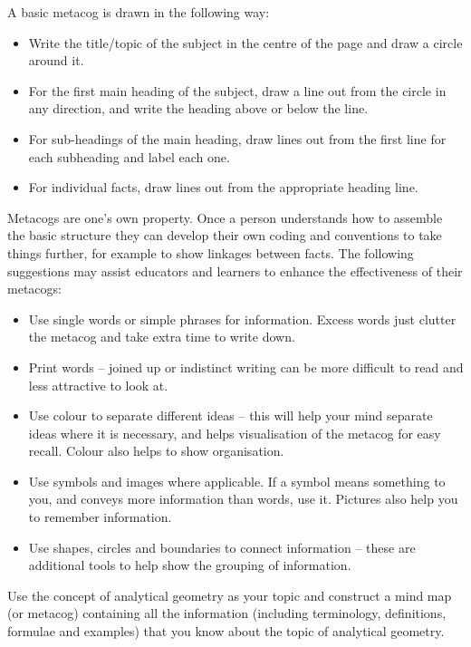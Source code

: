 A basic metacog is drawn in the following way:
\begin{itemize}[noitemsep]
\item Write the title/topic of the subject in the centre of the page and draw a circle around it.
\item For the first main heading of the subject, draw a line out from the circle in any direction, and write the heading above or below the line.
\item For sub-headings of the main heading, draw lines out from the first line for each subheading and label each one. 
\item For individual facts, draw lines out from the appropriate heading line. 
\end{itemize}
Metacogs are one’s own property. Once a person understands how to assemble the basic structure they can develop their own coding and conventions to take things further, for example to show linkages between facts. The following suggestions may assist educators and learners to enhance the effectiveness of their metacogs:
\begin{itemize}[noitemsep]
\item Use single words or simple phrases for information. Excess words just clutter the metacog and take extra time to write down.
\item Print words – joined up or indistinct writing can be more difficult to read and less attractive to look at. 
\item Use colour to separate different ideas – this will help your mind separate ideas where it is necessary, and helps visualisation of the metacog for easy recall. Colour also helps to show organisation.
\item Use symbols and images where applicable. If a symbol means something to you, and conveys more information than words, use it. Pictures also help you to remember information.
\item Use shapes, circles and boundaries to connect information – these are additional tools to help show the grouping of information.
\end{itemize}
Use the concept of analytical geometry as your topic and construct a mind map (or metacog) containing all the information (including terminology, definitions, formulae and examples) that you know about the topic of analytical geometry. \par 

